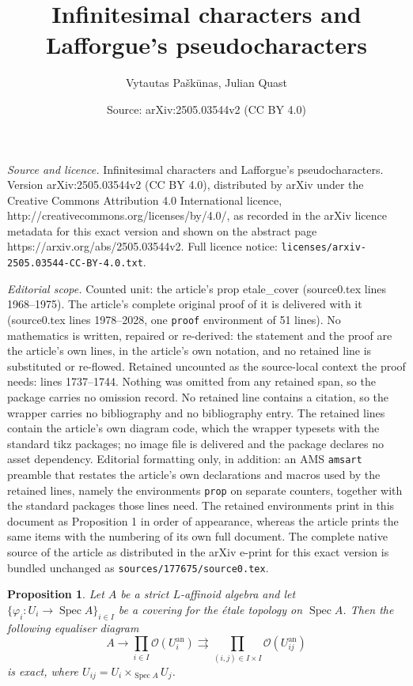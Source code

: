 \documentclass[10pt,a4paper]{amsart}
\title{Infinitesimal characters and Lafforgue's pseudocharacters}
\author{Vytautas Pa\v{s}k\=unas, Julian Quast}
\date{Source: arXiv:2505.03544v2 (CC BY 4.0)}
\newtheorem{prop}{Proposition}
\newcommand{\OO}{\mathcal O}
\DeclareMathOperator{\Spec}{Spec}
\newcommand{\ana}{\mathrm{an}}
\begin{document}
\maketitle

\noindent\emph{Source and licence.} Infinitesimal characters and Lafforgue's pseudocharacters. Version arXiv:2505.03544v2 (CC BY 4.0), distributed by arXiv under the Creative Commons Attribution 4.0 International licence, http://creativecommons.org/licenses/by/4.0/, as recorded in the arXiv licence metadata for this exact version and shown on the abstract page https://arxiv.org/abs/2505.03544v2. Full licence notice: \texttt{licenses/arxiv-2505.03544-CC-BY-4.0.txt}.\par\smallskip

\noindent\textit{Editorial scope.} Counted unit: the article's prop etale\_cover (source0.tex lines 1968--1975). The article's complete original proof of it is delivered with it (source0.tex lines 1978--2028, one \texttt{proof} environment of 51 lines). No mathematics is written, repaired or re-derived: the statement and the proof are the article's own lines, in the article's own notation, and no retained line is substituted or re-flowed.  Retained uncounted as the source-local context the proof needs: lines 1737--1744.  Nothing was omitted from any retained span, so the package carries no omission record.  No retained line contains a citation, so the wrapper carries no bibliography and no bibliography entry.  The retained lines contain the article's own diagram code, which the wrapper typesets with the standard tikz packages; no image file is delivered and the package declares no asset dependency.  Editorial formatting only, in addition: an AMS \texttt{amsart} preamble that restates the article's own declarations and macros used by the retained lines, namely the environments \texttt{prop} on separate counters, together with the standard packages those lines need.  The retained environments print in this document as Proposition 1 in order of appearance, whereas the article prints the same items with the numbering of its own full document.  The complete native source of the article as distributed in the arXiv e-print for this exact version is bundled unchanged as \texttt{sources/177675/source0.tex}.
\begin{prop}
\label{etale_cover_aff} Let $A$ be a strict 
$L$-affinoid algebra and let $\{\varphi_i: U_i\rightarrow \Spec A\}_{i\in I}$ be a covering for the \'etale topology on $\Spec A$. Then the  following equaliser diagram 
\begin{equation}\label{equaliser}
 A \rightarrow \prod_{i\in I} \OO(U^{\ana}_i) \rightrightarrows \prod_{(i,j)\in I \times I} \OO(U^{\ana}_{ij})
\end{equation}
is exact, where $U_{ij}= U_i \times_{\Spec A} U_j$. 
\end{prop}
\end{document}
